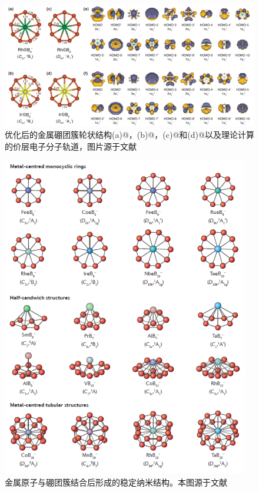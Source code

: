 \begin{figure}
  \includegraphics[width=1.0\textwidth]{figs/ch1_boron_wheel02.png}
  \centering
  \caption{优化后的金属硼团簇轮状结构(a)@，(b)@，(c)@和(d)@以及理论计算的价层电子分子轨道，图片源于文献\cite{li2012transition}}
  \label{fig:ch1_boron_wheel02}
\end{figure}

\begin{figure}
  \includegraphics[width=0.96\textwidth]{figs/ch1_boron_metal_cluster.png}
  \centering
  \caption{金属原子与硼团簇结合后形成的稳定纳米结构。本图源于文献\cite{li2017planar}}
  \label{fig:ch1_boron_metal_cluster}
\end{figure}

